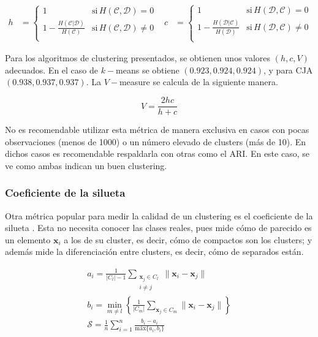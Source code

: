 					$$
					\begin{aligned}
						h &= \begin{cases}
							1 & \text{si}\, H(\mathscr{C}, \mathscr{D}) = 0\\
							1 - \frac{H(\mathscr{C}|\mathscr{D})}{H(\mathscr{C})} & \text{si}\, H(\mathscr{C}, \mathscr{D}) \neq 0\\
						\end{cases} & 
						c &= \begin{cases}
							1 & \text{si}\, H(\mathscr{D}, \mathscr{C}) = 0\\
							1 - \frac{H(\mathscr{D}|\mathscr{C})}{H(\mathscr{D})} & \text{si}\, H(\mathscr{D}, \mathscr{C}) \neq 0\\
						\end{cases}
					\end{aligned}
					$$
					
					Para los algoritmos de clustering presentados, se obtienen unos valores $(h, c, V)$ adecuados. En el caso de $k-$means se obtiene $(0.923, 0.924, 0.924)$, y para CJA $(0.938, 0.937, 0.937)$. La $V-$measure se calcula de la siguiente manera. 
					
					$$
					V = \frac{2hc}{h + c}
					$$
					
					No es recomendable utilizar esta métrica de manera exclusiva en casos con pocas observaciones (menos de 1000) o un número elevado de clusters (más de 10). En dichos casos es recomendable respaldarla con otras como el ARI. En este caso, se ve como ambas indican un buen clustering.
					
				\subsubsection{Coeficiente de la silueta}
				
					 Otra métrica popular para medir la calidad de un clustering es el coeficiente de la silueta \cite{formulas_silhouette}. Esta no necesita conocer las clases reales, pues mide cómo de parecido es un elemento $\textbf{x}_i$ a los de su cluster, es decir, cómo de compactos son los clusters; y además mide la diferenciación entre clusters, es decir, cómo de separados están. 
					 
					 $$
					 \begin{gathered}
					 	a_i = \frac{1}{|C_l| - 1}\sum_{\substack{\textbf{x}_j\in C_l\\ i\neq j}}\|\textbf{x}_i - \textbf{x}_j\|\\
					 	b_i = \min_{m \neq l}\left\lbrace\frac{1}{|C_m|}\sum_{\textbf{x}_j\in C_m}\|\textbf{x}_i - \textbf{x}_j\|\right\rbrace\\
					 	\mathcal{S} = \frac{1}{n}\sum_{i = 1}^{n}\frac{b_i - a_i}{\text{máx}\{a_i, b_i\}}
					 \end{gathered}
					 $$
					 
